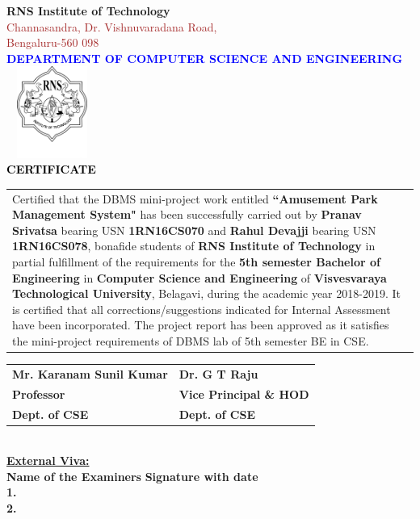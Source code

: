\thispagestyle{empty}
\begin{center}
\break\break
\textup{\large {\textcolor{darkbrown}{\bf RNS Institute of Technology}} \\
{\normalsize{\textcolor{brown}{Channasandra, Dr. Vishnuvaradana Road,\\ Bengaluru-560 098}}}}\\[0.1in]
\textup{\normalsize {\textcolor{blue}{\bf DEPARTMENT OF COMPUTER SCIENCE AND ENGINEERING}}}\\[0.1in]
\includegraphics[width=3cm, height=3cm]{./RNS_logo.png}\\[0.1in]
\textup{\large {\textcolor{black}{\textbf {CERTIFICATE}}}} \\[0.1in]
\end{center}

\justify
\begin{tabular}{p{15cm}}
\hspace{0.4cm} Certified that the DBMS mini-project work entitled \textbf{``Amusement Park Management System"} has been successfully carried out by \textbf{Pranav Srivatsa} bearing USN \textbf{1RN16CS070} and \textbf{Rahul Devajji} bearing USN \textbf{1RN16CS078}, bonafide students of \textbf{RNS Institute of Technology } in partial fulfillment of the requirements for the \textbf{5th semester Bachelor of Engineering} in \textbf{Computer Science and Engineering} of \textbf{Visvesvaraya Technological University}, Belagavi, during the academic year 2018-2019. It is certified that all corrections/suggestions indicated for Internal Assessment have been incorporated. The project report has been approved as it satisfies the mini-project requirements of DBMS lab of 5th semester BE in CSE.\\[0.7in]
\end{tabular}

\justify
\begin{tabular}{l l}
\textbf{Mr. Karanam Sunil Kumar} & \hspace{1.7in}\textbf{Dr. G T Raju}\\
\textbf{Professor} & \hspace{1.7in}\textbf{Vice Principal \& HOD}\\
\textbf{Dept. of CSE} & \hspace{1.7in}\textbf{Dept. of CSE}\\[0.2in]
\end{tabular}
\\[0.3in]

\justify
\textup{\underline{\textbf{External Viva:}}} \\
\textup{\textbf{Name of the Examiners}}\hspace{6cm} {\textbf{Signature with date}} \\
\justify
\textup{\textbf{1.}} \\[0.4in]
\textup{\textbf{2.}}
\newpage
